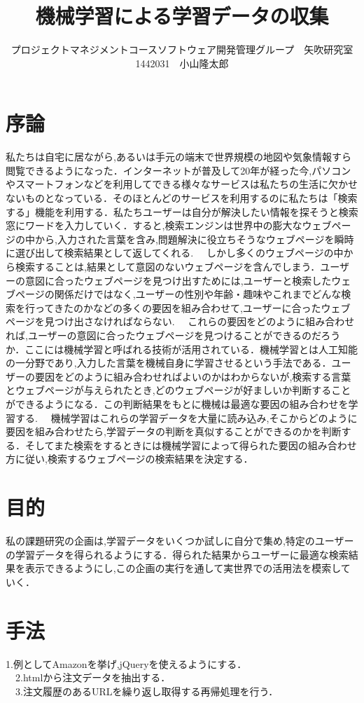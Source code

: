 \documentclass[uplatex,twocolumn,dvipdfmx]{jsarticle}
\title{\vspace{-5mm}\fontsize{14pt}{0pt}\selectfont 機械学習による学習データの収集}
\author{\normalsize プロジェクトマネジメントコースソフトウェア開発管理グループ　矢吹研究室　1442031　小山隆太郎}
\date{}
\begin{document}
\fontsize{10.5pt}{\baselineskip}\selectfont
\maketitle





\section{序論}
私たちは自宅に居ながら,あるいは手元の端末で世界規模の地図や気象情報すら閲覧できるようになった．インターネットが普及して20年が経った今,パソコンやスマートフォンなどを利用してできる様々なサービスは私たちの生活に欠かせないものとなっている．そのほとんどのサービスを利用するのに私たちは「検索する」機能を利用する．私たちユーザーは自分が解決したい情報を探そうと検索窓にワードを入力していく．すると,検索エンジンは世界中の膨大なウェブページの中から,入力された言葉を含み,問題解決に役立ちそうなウェブページを瞬時に選び出して検索結果として返してくれる.\cite{KADOKAWA2015}
　しかし多くのウェブページの中から検索することは,結果として意図のないウェブページを含んでしまう．ユーザーの意図に合ったウェブページを見つけ出すためには,ユーザーと検索したウェブページの関係だけではなく,ユーザーの性別や年齢・趣味やこれまでどんな検索を行ってきたのかなどの多くの要因を組み合わせて,ユーザーに合ったウェブページを見つけ出さなければならない.\cite{GENTOSYA2014}
　これらの要因をどのように組み合わせれば,ユーザーの意図に合ったウェブページを見つけることができるのだろうか．ここには機械学習と呼ばれる技術が活用されている．機械学習とは人工知能の一分野であり,入力した言葉を機械自身に学習させるという手法である．ユーザーの要因をどのように組み合わせればよいのかはわからないが,検索する言葉とウェブページが与えられたとき,どのウェブページが好ましいか判断することができるようになる．この判断結果をもとに機械は最適な要因の組み合わせを学習する.\cite{SOTURON2015}
　機械学習はこれらの学習データを大量に読み込み,そこからどのように要因を組み合わせたら,学習データの判断を真似することができるのかを判断する．そしてまた検索をするときには機械学習によって得られた要因の組み合わせ方に従い,検索するウェブページの検索結果を決定する．


\section{目的}
私の課題研究の企画は,学習データをいくつか試しに自分で集め,特定のユーザーの学習データを得られるようにする．得られた結果からユーザーに最適な検索結果を表示できるようにし,この企画の実行を通して実世界での活用法を模索していく．


\section{手法}
1.例としてAmazonを挙げ,jQueryを使えるようにする．\\
　2.htmlから注文データを抽出する．\\
　3.注文履歴のあるURLを繰り返し取得する再帰処理を行う．


\end{document}
